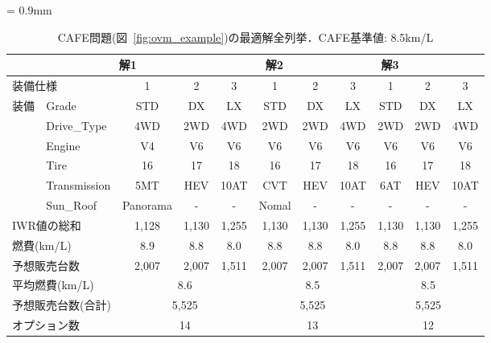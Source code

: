 \begin{table*}[htbp]
  \caption{CAFE問題(図~\ref{fig:ovm_example})の最適解全列挙．CAFE基準値: 8.5km/L}
  \centering
  \tabcolsep = 0.9mm
  \begin{tabular}{l|l|c|c|c||c|c|c||c|c|c} \bhline
    \multicolumn{2}{l|}{} & \multicolumn{3}{c||}{解1} & \multicolumn{3}{c||}{解2} & \multicolumn{3}{c}{\bf{解3}}\\ \hline
    \multicolumn{2}{l|}{装備仕様} & 1 & 2 & 3 & 1 & 2 & 3 & 1 & 2 & 3 \\ \hline
    装備 & \textsf{Grade}        & \textsf{STD}& \textsf{DX} & \textsf{LX}& \textsf{STD} & \textsf{DX}  & \textsf{LX}    & \textsf{STD} & \textsf{DX}  & \textsf{LX}       \\
        & \textsf{Drive\_Type}  & \textsf{4WD}  & \textsf{2WD} & \textsf{4WD} & \textsf{2WD} & \textsf{2WD} & \textsf{4WD} & \textsf{2WD} & \textsf{2WD} & \textsf{4WD}  \\
        & \textsf{Engine} & \textsf{V4} & \textsf{V6} & \textsf{V6} & \textsf{V6} & \textsf{V6} & \textsf{V6} & \textsf{V6} & \textsf{V6} & \textsf{V6}      \\ 
        & \textsf{Tire} & \textsf{16}	& \textsf{17} & \textsf{18} & \textsf{16}  & \textsf{17}  & \textsf{18} & \textsf{16} & \textsf{17} & \textsf{18} \\
        & \textsf{Transmission} & \textsf{5MT} & \textsf{HEV} & \textsf{10AT} & \textsf{CVT} & \textsf{HEV} & \textsf{10AT}  & \textsf{6AT} & \textsf{HEV} & \textsf{10AT}     \\
        & \textsf{Sun\_Roof} & \textsf{Panorama} & -   & -       & \textsf{Nomal} & -  & -     & -   & -   & -       \\ \hline
    \multicolumn{2}{l|}{IWR値の総和}  & 1,128 & 1,130   & 1,255    & 1,130 & 1,130&1,255  & 1,130& 1,130& 1,255     \\ %
    \multicolumn{2}{l|}{燃費(km/L)}    & 8.9 & 8.8    & 8.0     & 8.8 & 8.8  & 8.0 & 8.8  & 8.8  & 8.0         \\ %
    \multicolumn{2}{l|}{予想販売台数}  & 2,007  & 2,007   & 1,511   & 2,007 & 2,007 & 1,511 & 2,007& 2,007& 1,511       \\ \hline
    \multicolumn{2}{l|}{平均燃費(km/L)} & \multicolumn{3}{c||}{8.6} & \multicolumn{3}{c||}{8.5} & \multicolumn{3}{c}{8.5}\\ 
    \multicolumn{2}{l|}{予想販売台数(合計)}  & \multicolumn{3}{c||}{5,525} & \multicolumn{3}{c||}{5,525}  &\multicolumn{3}{c}{5,525}\\
    \multicolumn{2}{l|}{オプション数}  & \multicolumn{3}{c||}{14} & \multicolumn{3}{c||}{13}  &\multicolumn{3}{c}{12}\\ \hline
  \end{tabular}
  \label{tab:optN}
\end{table*}

